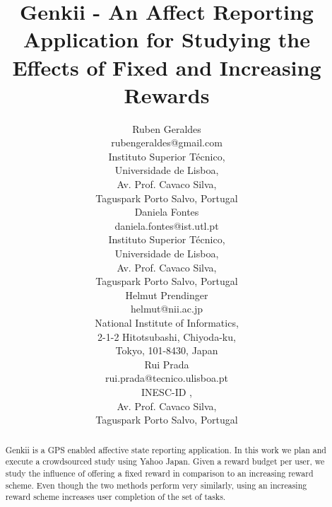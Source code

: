 \documentclass[letterpaper]{article}
\begin{document}
 
%
\title{Genkii - An Affect Reporting Application for Studying the Effects of Fixed and Increasing Rewards}
\author{Ruben Geraldes \\
rubengeraldes@gmail.com \\
Instituto Superior T\'{e}cnico, \\ Universidade de Lisboa,\\
	Av. Prof. Cavaco Silva, \\ Taguspark Porto Salvo, Portugal\\ 
	\And Daniela Fontes\\
	daniela.fontes@ist.utl.pt \\
	Instituto Superior T\'{e}cnico, \\ Universidade de Lisboa,\\
	Av. Prof. Cavaco Silva, \\ Taguspark Porto Salvo, Portugal\\
	\AND Helmut Prendinger \\
	helmut@nii.ac.jp\\
	National Institute of Informatics,\\
	2-1-2 Hitotsubashi, Chiyoda-ku, \\ Tokyo, 101-8430, Japan \\ 
	\And Rui Prada\\
	rui.prada@tecnico.ulisboa.pt\\
	INESC-ID ,\\
	Av. Prof. Cavaco Silva, \\ Taguspark Porto Salvo, Portugal\\		
}



\maketitle


\begin{abstract}

Genkii is a GPS enabled affective state reporting application. In this work we plan and execute a crowdsourced study using Yahoo Japan. Given a reward budget per user, we study the influence of offering a fixed reward in comparison to an increasing reward scheme. Even though the two methods perform very similarly, using an increasing reward scheme increases user completion of the set of tasks.

\end{abstract}
\end{document}
